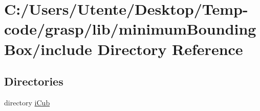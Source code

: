 \section{C\+:/\+Users/\+Utente/\+Desktop/\+Temp-\/code/grasp/lib/minimum\+Bounding\+Box/include Directory Reference}
\label{dir_6907e0833d2b4b2fc4a1cc6414715885}
\subsection*{Directories}
\begin{DoxyCompactItemize}
\item 
directory \hyperlink{dir_de71adeb27bc20bbe9a183506ef177a4}{i\+Cub}
\end{DoxyCompactItemize}
